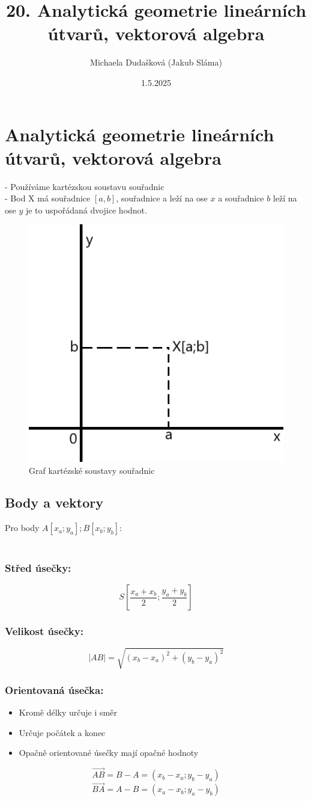 \title{20. Analytická geometrie lineárních útvarů, vektorová algebra}
\author{Michaela Dudašková (Jakub Sláma)}
\date{1.5.2025}

\maketitle

\section{Analytická geometrie lineárních útvarů, vektorová algebra}
- Používáme kartézskou soustavu souřadnic \\
- Bod X má souřadnice $[a,b]$, souřadnice a leží na ose $x$ a souřadnice $b$ leží na ose $y$ je to uspořádaná dvojice hodnot.\\
\begin{figure}[H]
        \centering
        \includegraphics[width=0.4\linewidth]{img/20_kartezka_souradnice.png}
        \caption{Graf kartézské soustavy souřadnic} 
        \label{fig:enter-label}
    \end{figure}

\subsection{Body a vektory}
Pro body $A[x_a;y_a];B[x_b;y_b]$:\\ \\
\subsubsection{Střed úsečky:} 
$$
    S[\frac{x_a+x_b}{2};\frac{y_a+y_b}{2}]
$$ 
\subsubsection{Velikost úsečky:} 
$$
    |AB|=\sqrt{(x_b-x_a)^2+(y_b-y_a)^2}
$$
\subsubsection{Orientovaná úsečka:}
\begin{itemize}
    \item Kromě délky určuje i směr
    \item Určuje počátek a konec
    \item Opačně orientované úsečky mají opačné hodnoty
\end{itemize}
$$
    \overrightarrow{AB}=B-A=(x_b-x_a;y_b-y_a)
$$
$$
    \overrightarrow{BA}=A-B=(x_a-x_b;y_a-y_b)
$$
